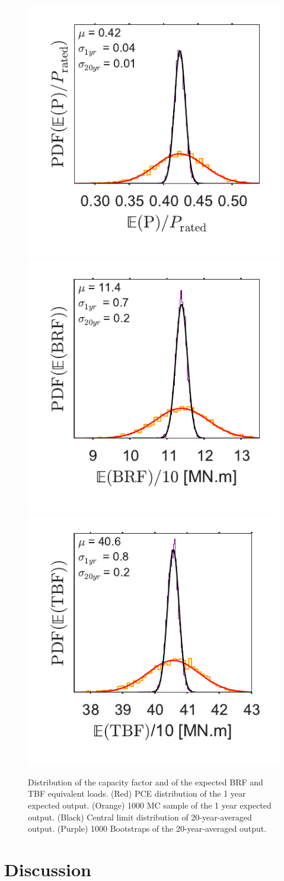 \documentclass[preprint,12pt]{elsarticle}
\begin{document}
\begin{figure}[h!]
\begin{centering}
\includegraphics[width=0.32\columnwidth]{Figures/U_AEP/AEP_U.pdf}
\includegraphics[width=0.32\columnwidth]{Figures/U_AEP/E_BRFBM_U.pdf}
\includegraphics[width=0.32\columnwidth]{Figures/U_AEP/E_TBFBM_U.pdf}
\caption{Distribution of the capacity factor and of the expected BRF and TBF equivalent loads. (Red) PCE distribution of the 1 year expected output. (Orange) 1000 MC sample of the 1 year expected output. (Black) Central limit distribution of 20-year-averaged output. (Purple) 1000 Bootstraps of the 20-year-averaged output.}
\label{fig_AEP_U}
\end{centering}
\end{figure}


\section{Discussion}
\end{document}

